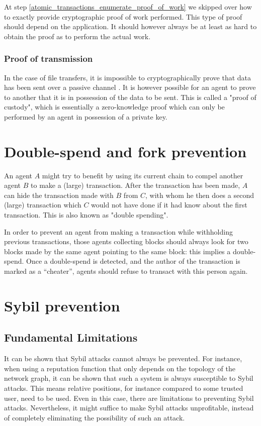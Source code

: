 At step \ref{atomic_transactions_enumerate_proof_of_work} we skipped over how to exactly provide cryptographic proof of work performed. 
This type of proof should depend on the application. 
It should however always be at least as hard to obtain the proof as to perform the actual work.

\subsubsection{Proof of transmission}\label{sssection:proof_of_transmission}
In the case of file transfers, 
it is impossible to cryptographically prove that data has been sent over a passive channel \cite{kravchenko}. 
It is however possible for an agent to prove to another that it is in possession of the data to be sent. 
This is called a "proof of custody", which is essentially a zero-knowledge proof which can only be performed by an agent in possession of a private key.

\section{Double-spend and fork prevention}
An agent $A$ might try to benefit by using its current chain to compel another agent $B$ to make a (large) transaction. After the transaction has been made, $A$ can hide the transaction made with $B$ from $C$, with whom he then does a second (large) transaction which $C$ would not have done if it had know about the first transaction. This is also known as "double spending".

In order to prevent an agent from making a transaction while withholding previous transactions, those agents collecting blocks should always look for two blocks made by the same agent pointing to the same block: this implies a double-spend. Once a double-spend is detected, and the author of the transaction is marked as a ``cheater'', agents should refuse to transact with this person again.

\section{Sybil prevention}
\subsection{Fundamental Limitations}
It can be shown that Sybil attacks cannot always be prevented. 
For instance, when using a reputation function that only depends on the topology of the network graph, 
it can be shown that such a system is always susceptible to Sybil attacks. 
This means relative positions, 
for instance compared to some trusted user, 
need to be used. 
Even in this case, 
there are limitations to preventing Sybil attacks. 
Nevertheless, it might suffice to make Sybil attacks unprofitable, 
instead of completely eliminating the possibility of such an attack. 

